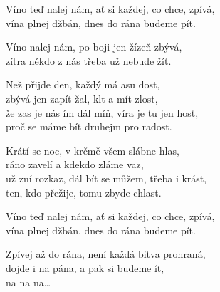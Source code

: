 
Víno teď nalej nám, ať si každej, co chce, zpívá,\\
vína plnej džbán, dnes do rána budeme pít. 

Víno nalej nám, po boji jen žízeň zbývá,\\
zítra někdo z nás třeba už nebude žít.

\ve{}
Než přijde den, každý má asu dost,\\
zbývá jen zapít žal, klt a mít zlost,\\
že zas je nás ím dál míň, víra je tu jen host,\\
proč se máme bít druhejm pro radost. 


\ve{}
Krátí se noc, v krčmě všem slábne hlas,\\
ráno zavelí a kdekdo zláme vaz,\\
už zní rozkaz, dál bít se můžem, třeba i krást,\\
ten, kdo přežije, tomu zbyde chlast.



Víno teď nalej nám, ať si každej, co chce, zpívá,\\
vína plnej džbán, dnes do rána budeme pít. 


\ve{}
Zpívej až do rána, není každá bitva prohraná,\\
dojde i na pána, a pak si budeme ít,\\
na na na\ldots

\esong{}